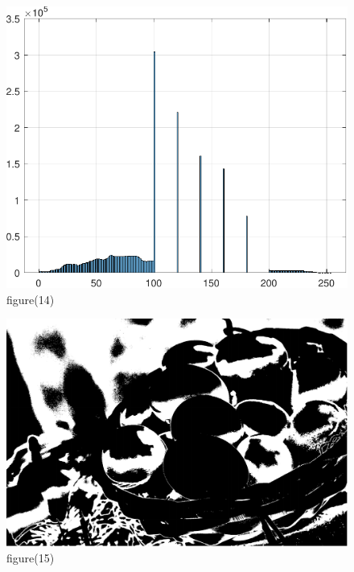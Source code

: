 \documentclass[10pt,a4paper,twoside]{article}%
\begin{document}
\begin{figure}[H]
    \centering
    \includegraphics[width=1\linewidth]{kod matlab/myVectorFile14.pdf}
\caption{figure(14)}
    \label{fig:obr1}
\end{figure}

\begin{figure}[H]
    \centering
    \includegraphics[width=1\linewidth]{kod matlab/myVectorFile15.pdf}
\caption{figure(15)}
    \label{fig:obr1}
\end{figure}
\end{document}
